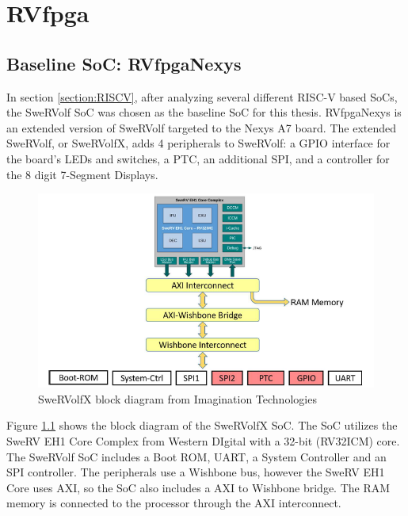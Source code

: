 \chapter{RVfpga}
\label{chapter:rvfpga}
\section{Baseline SoC: RVfpgaNexys}
In section \ref{section:RISCV}, after analyzing several different RISC-V based SoCs, the SweRVolf SoC was chosen as the baseline SoC for this thesis. RVfpgaNexys is an extended version of SweRVolf targeted to the Nexys A7 board. The extended SweRVolf, or SweRVolfX, adds 4 peripherals to SweRVolf: a GPIO interface for the board's LEDs and switches, a PTC, an additional SPI, and a controller for the 8 digit 7-Segment Displays.

\begin{figure}[h]
    \centering
    \includegraphics[scale=0.7]{Figures/SweRVolfX.png}
    \caption{SweRVolfX block diagram from Imagination Technologies}
    \label{fig:SweRVolfX}
\end{figure}

Figure \ref{fig:SweRVolfX} shows the block diagram of the SweRVolfX SoC. The SoC utilizes the SweRV EH1 Core Complex from Western DIgital with a 32-bit (RV32ICM) core. The SweRVolf SoC includes a Boot ROM, UART, a System Controller and an SPI controller. The peripherals use a Wishbone bus, however the SweRV EH1 Core uses AXI, so the SoC also includes a AXI to Wishbone bridge. The RAM memory is connected to the processor through the AXI interconnect.

